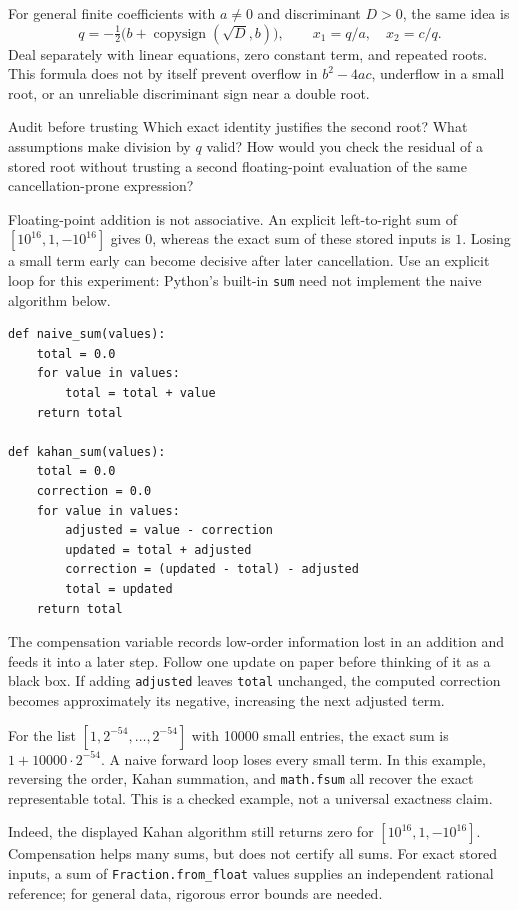 For general finite coefficients with $a\ne0$ and discriminant $D>0$, the same idea is
\[
 q=-\tfrac12\bigl(b+\operatorname{copysign}(\sqrt D,b)\bigr),\qquad
 x_1=q/a,\quad x_2=c/q.
\]
Deal separately with linear equations, zero constant term, and repeated roots.
This formula does not by itself prevent overflow in $b^2-4ac$, underflow in a
small root, or an unreliable discriminant sign near a double root.
\begin{question}{Audit before trusting}
Which exact identity justifies the second root? What assumptions make division
by $q$ valid? How would you check the residual of a stored root without trusting
a second floating-point evaluation of the same cancellation-prone expression?
\end{question}

\newpage
{}
Floating-point addition is not associative. An explicit left-to-right sum of
$[10^{16},1,-10^{16}]$ gives $0$, whereas the exact sum of these stored inputs is
$1$. Losing a small term early can become decisive after later cancellation.
Use an explicit loop for this experiment: Python's built-in \texttt{sum} need not
implement the naive algorithm below.
\begin{lstlisting}
def naive_sum(values):
    total = 0.0
    for value in values:
        total = total + value
    return total

def kahan_sum(values):
    total = 0.0
    correction = 0.0
    for value in values:
        adjusted = value - correction
        updated = total + adjusted
        correction = (updated - total) - adjusted
        total = updated
    return total
\end{lstlisting}
The compensation variable records low-order information lost in an addition and
feeds it into a later step. Follow one update on paper before thinking of it as a
black box. If adding \texttt{adjusted} leaves \texttt{total} unchanged, the computed
correction becomes approximately its negative, increasing the next adjusted term.

For the list $[1,2^{-54},\ldots,2^{-54}]$ with 10000 small entries, the exact sum
is $1+10000\cdot2^{-54}$. A naive forward loop loses every small term. In this
example, reversing the order, Kahan summation, and \texttt{math.fsum} all recover
the exact representable total. This is a checked example, not a universal exactness claim.

Indeed, the displayed Kahan algorithm still returns zero for
$[10^{16},1,-10^{16}]$. Compensation helps many sums, but does not certify all sums.
For exact stored inputs, a sum of \texttt{Fraction.from\_float} values supplies an
independent rational reference; for general data, rigorous error bounds are needed.

